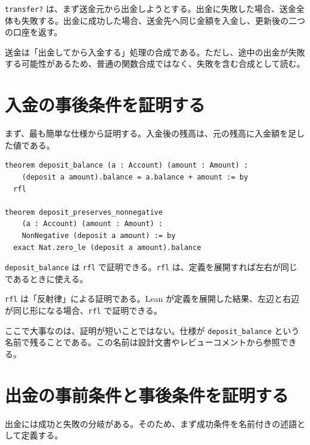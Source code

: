 \texttt{transfer?} は、まず送金元から出金しようとする。出金に失敗した場合、送金全体も失敗する。出金に成功した場合、送金先へ同じ金額を入金し、更新後の二つの口座を返す。

\begin{intuitionbox}
送金は「出金してから入金する」処理の合成である。ただし、途中の出金が失敗する可能性があるため、普通の関数合成ではなく、失敗を含む合成として読む。
\end{intuitionbox}


\section{入金の事後条件を証明する}

まず、最も簡単な仕様から証明する。入金後の残高は、元の残高に入金額を足した値である。

\begin{listing}[htbp]
\begin{verbatim}
theorem deposit_balance (a : Account) (amount : Amount) :
    (deposit a amount).balance = a.balance + amount := by
  rfl

theorem deposit_preserves_nonnegative
    (a : Account) (amount : Amount) :
    NonNegative (deposit a amount) := by
  exact Nat.zero_le (deposit a amount).balance
\end{verbatim}
\caption{入金後の残高仕様}
\label{lst:ch19-deposit-proof}
\end{listing}

\texttt{deposit\_balance} は \texttt{rfl} で証明できる。\texttt{rfl} は、定義を展開すれば左右が同じであるときに使える。

\begin{definitionbox}
\texttt{rfl} は「反射律」による証明である。Lean が定義を展開した結果、左辺と右辺が同じ形になる場合、\texttt{rfl} で証明できる。
\end{definitionbox}

ここで大事なのは、証明が短いことではない。仕様が \texttt{deposit\_balance} という名前で残ることである。この名前は設計文書やレビューコメントから参照できる。

\section{出金の事前条件と事後条件を証明する}

出金には成功と失敗の分岐がある。そのため、まず成功条件を名前付きの述語として定義する。

